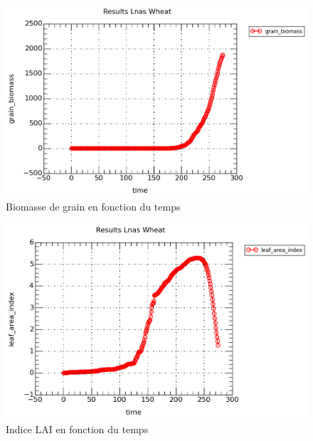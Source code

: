 \begin{figure}[H]

\begin{center}
 \includegraphics[scale = 0.63]{./img/grain.png}
 \caption{Biomasse de grain en fonction du temps}
 \label{fig:resultatGrain}
\end{center}

\end{figure}

\begin{figure}[H]

\begin{center}
 \includegraphics[scale = 0.63]{./img/LAI.png}
 \caption{Indice LAI en fonction du temps}
 \label{fig:resultatLAI}
\end{center}

\end{figure}

